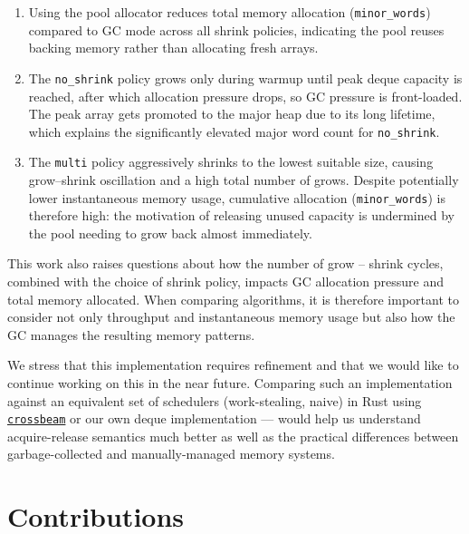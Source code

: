 \documentclass[11pt,a4paper]{article}
\begin{document}
\begin{enumerate}[nosep]
    \item Using the pool allocator reduces total memory allocation
    (\texttt{minor\_words}) compared to GC mode across all shrink policies,
    indicating the pool reuses backing memory rather than allocating fresh arrays.
    \item The \texttt{no\_shrink} policy grows only during warmup until peak
    deque capacity is reached, after which allocation pressure drops, so GC
    pressure is front-loaded. The peak array gets promoted to the major heap
    due to its long lifetime, which explains the significantly elevated major
    word count for \texttt{no\_shrink}.
    \item The \texttt{multi} policy aggressively shrinks to the lowest suitable
    size, causing grow--shrink oscillation and a high total number of grows.
    Despite potentially lower instantaneous memory usage, cumulative allocation
    (\texttt{minor\_words}) is therefore high: the motivation of releasing unused
    capacity is undermined by the pool needing to grow back almost immediately.
\end{enumerate}

This work also raises questions about how the number of grow -- shrink cycles,
combined with the choice of shrink policy, impacts GC allocation pressure and
total memory allocated. When comparing algorithms, it is therefore important to
consider not only throughput and instantaneous memory usage but also how the GC
manages the resulting memory patterns.

We stress that this implementation requires refinement and that we would like to
continue working on this in the near future. Comparing such an implementation
against an equivalent set of schedulers (work-stealing, naive) in Rust using
\href{https://docs.rs/crossbeam-deque/latest/crossbeam_deque/}{\texttt{crossbeam}}
or our own deque implementation — would help us understand acquire-release
semantics much better as well as the practical differences between
garbage-collected and manually-managed memory systems.

\section*{Contributions}
\label{sec:contributions}
\end{document}
